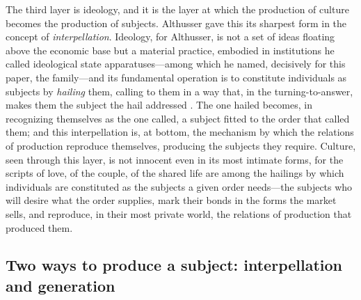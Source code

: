 The third layer is ideology, and it is the layer at which the production of culture becomes the production of subjects. Althusser gave this its sharpest form in the concept of \emph{interpellation}. Ideology, for Althusser, is not a set of ideas floating above the economic base but a material practice, embodied in institutions he called ideological state apparatuses---among which he named, decisively for this paper, the family---and its fundamental operation is to constitute individuals as subjects by \emph{hailing} them, calling to them in a way that, in the turning-to-answer, makes them the subject the hail addressed \parencite{althusser1971}. The one hailed becomes, in recognizing themselves as the one called, a subject fitted to the order that called them; and this interpellation is, at bottom, the mechanism by which the relations of production reproduce themselves, producing the subjects they require. Culture, seen through this layer, is not innocent even in its most intimate forms, for the scripts of love, of the couple, of the shared life are among the hailings by which individuals are constituted as the subjects a given order needs---the subjects who will desire what the order supplies, mark their bonds in the forms the market sells, and reproduce, in their most private world, the relations of production that produced them.

\subsection*{Two ways to produce a subject: interpellation and generation}

